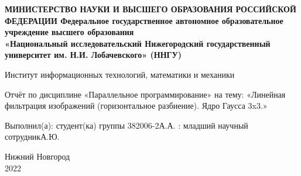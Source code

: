 \documentclass[12pt,a4paper]{article}
\title{}
\author{}
\date{}
\begin{document}
\begin{titlepage}
    \newpage
    \begin{center}
    {\bfseries МИНИСТЕРСТВО НАУКИ И ВЫСШЕГО ОБРАЗОВАНИЯ РОССИЙСКОЙ ФЕДЕРАЦИИ
Федеральное государственное автономное образовательное учреждение
высшего образования
 \\
    «Национальный исследовательский
Нижегородский государственный университет им. Н.И. Лобачевского»
(ННГУ)
}

     Институт информационных технологий, математики и механики \\
    \end{center}

    \vspace{1.2em}

    \begin{center}
    \Large Отчёт по дисциплине \linebreak «Параллельное программирование» \linebreak на тему: \linebreak
«Линейная фильтрация изображений (горизонтальное разбиение). Ядро Гаусса 3x3.»

    \end{center}

    \vspace{5em}


    \begin{flushright}
                       Выполнил(а):
                       студент(ка) группы 382006-2 А.А.\underline{\hspace{3cm}} \linebreak{}: младший научный сотрудник А.Ю.\underline{\hspace{3cm}} 
    \end{flushright}

    \vspace{\fill}
    
    \begin{center}
    Нижний Новгород\\
    2022
    \end{center}

    \end{titlepage}
    
\maketitle
\end{document}

